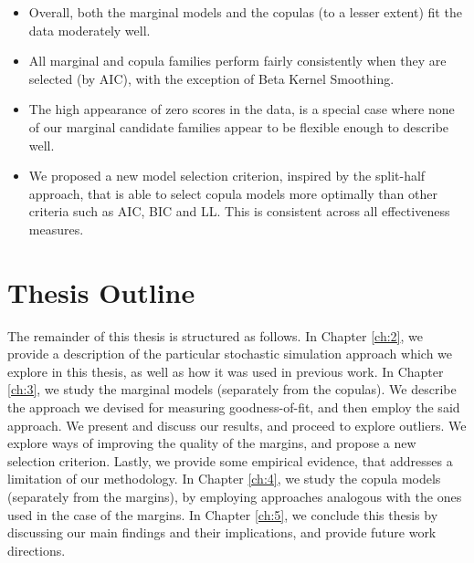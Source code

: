 \begin{itemize}
	\item Overall, both the marginal models and the copulas (to a lesser extent) fit the data moderately well.
	\item All marginal and copula families perform fairly consistently when they are selected (by AIC), with the exception of Beta Kernel Smoothing. 
	\item The high appearance of zero scores in the data, is a special case where none of our marginal candidate families appear to be flexible enough to describe well.
	\item We proposed a new model selection criterion, inspired by the split-half approach, that is able to select copula models more optimally than other criteria such as AIC, BIC and LL. This is consistent across all effectiveness measures.
\end{itemize}

\section{Thesis Outline}

The remainder of this thesis is structured as follows. In Chapter \ref{ch:2}, we provide a description of the particular stochastic simulation approach which we explore in this thesis, as well as how it was used in previous work. In Chapter \ref{ch:3}, we study the marginal models (separately from the copulas). We describe the approach we devised for measuring goodness-of-fit, and then employ the said approach. We present and discuss our results, and proceed to explore outliers. We explore ways of improving the quality of the margins, and propose a new selection criterion. Lastly, we provide some empirical evidence, that addresses a limitation of our methodology. In Chapter \ref{ch:4}, we study the copula models (separately from the margins), by employing approaches analogous with the ones used in the case of the margins. In Chapter \ref{ch:5}, we conclude this thesis by discussing our main findings and their implications, and provide future work directions.




